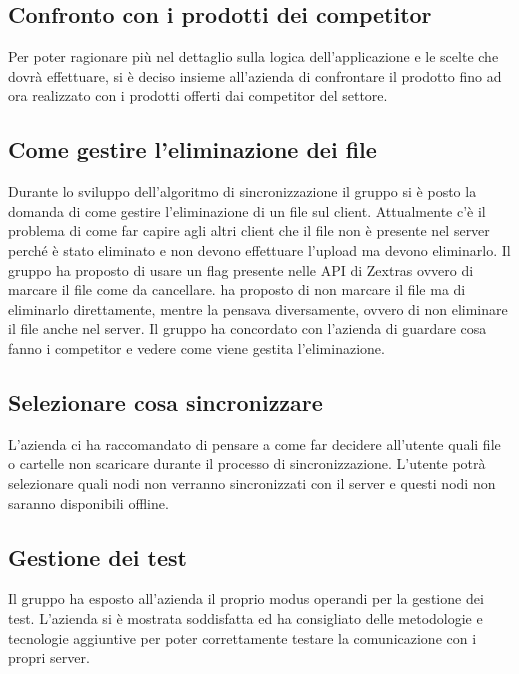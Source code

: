 \subsection{Confronto con i prodotti dei competitor}
Per poter ragionare più nel dettaglio sulla logica dell'applicazione e le scelte che dovrà effettuare, si è deciso insieme all'azienda di confrontare il prodotto fino ad ora realizzato con i prodotti offerti dai competitor del settore.

\subsection{Come gestire l'eliminazione dei file}
Durante lo sviluppo dell'algoritmo di sincronizzazione il gruppo si è posto la domanda di come gestire l'eliminazione di un file sul client. Attualmente c'è il problema di come far capire agli altri client che 
il file non è presente nel server perché è stato eliminato e non devono effettuare l'upload ma devono eliminarlo. Il gruppo ha proposto di usare un flag presente nelle API di Zextras ovvero di marcare il file come 
da cancellare. \textit{\Federico{}} ha proposto di non marcare il file ma di eliminarlo direttamente, mentre \textit{\Alessio{}} la pensava diversamente, ovvero di non eliminare il file anche nel server.
Il gruppo ha concordato con l'azienda di guardare cosa fanno i competitor e vedere come viene gestita l'eliminazione.

\subsection{Selezionare cosa sincronizzare}
L'azienda ci ha raccomandato di pensare a come far decidere all'utente quali file o cartelle non scaricare durante il processo di sincronizzazione.
L'utente potrà selezionare quali nodi non verranno sincronizzati con il server e questi nodi non saranno disponibili offline.

\subsection{Gestione dei test}
Il gruppo ha esposto all'azienda il proprio modus operandi per la gestione dei test. L'azienda si è mostrata soddisfatta ed ha consigliato delle metodologie e tecnologie aggiuntive per poter correttamente testare la comunicazione con i propri server.

\newpage

